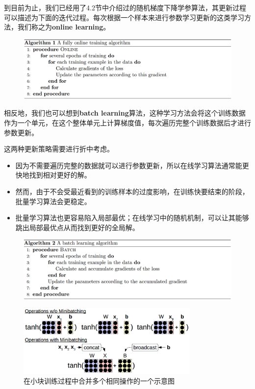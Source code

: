 \documentclass[10pt,a4paper]{ctexart}
\begin{document}
到目前为止，我们已经用了4.2节中介绍过的随机梯度下降学参算法，其更新过程可以描述为下面的迭代过程。每次根据一个样本来进行参数学习更新的这类学习方法，我们称之为\textbf{online learning}。

\begin{figure}[H]
\centering
\includegraphics[width=1\textwidth]{alg1.png}
\end{figure}

相反地，我们也可以想到\textbf{batch learning}算法，这种学习方法会将这个训练数据作为一个单元，在这个整体单元上计算梯度值，每次遍历完整个训练数据后才进行参数更新。

这两种更新策略需要进行折中考虑。
\begin{itemize}
\item 因为不需要遍历完整的数据就可以进行参数更新，所以在线学习算法通常能更快地找到相对更好的解。
\item 然而，由于不会受最近看到的训练样本的过度影响，在训练快要结束的阶段，批量学习算法会更稳定。
\item 批量学习算法也更容易陷入局部最优；在线学习中的随机机制，可以让其能够跳出局部最优点从而找到更好的全局解。
\end{itemize}

\begin{figure}[H]
\centering
\includegraphics[width=1\textwidth]{alg2.png}
\end{figure}

\begin{figure}[H]
\centering
\includegraphics[width=0.8\textwidth]{fig19.png}
\caption{在小块训练过程中合并多个相同操作的一个示意图}
\label{fig:19}
\end{figure}
\end{document}

